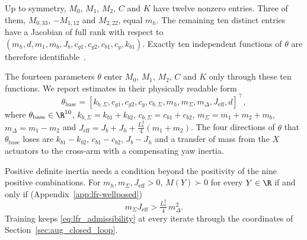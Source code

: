Up to symmetry, $M_0$, $M_1$, $M_2$, $C$ and $K$ have twelve nonzero entries.
Three of them, $M_{0,33}$, $-M_{1,12}$ and $M_{2,22}$, equal $m_h$.
The remaining ten distinct entries have a Jacobian of full rank with respect
to $(m_h,d,m_1,m_b,J_b,c_{g1},c_{g2},c_{b1},c_y,k_{b1})$.
Exactly ten independent functions of $\theta$ are therefore
identifiable~\cite[Def.~7]{ovchinnikov2021computing}.

The fourteen parameters $\theta$ enter $M_0$, $M_1$, $M_2$, $C$ and $K$ only
through these ten functions.
We report estimates in their physically readable form
\begin{equation}
  \theta_{\mathrm{base}}=[k_{b,\Sigma},c_{g1},c_{g2},c_y,c_{b,\Sigma},
  m_h,m_\Sigma,m_\Delta,J_{\mathrm{eff}},d]^\top,
  \label{eq:phi}
\end{equation}
where $\theta_{\mathrm{base}}\in\R^{10}$, $k_{b,\Sigma}=k_{b1}+k_{b2}$,
$c_{b,\Sigma}=c_{b1}+c_{b2}$, $m_\Sigma=m_1+m_2+m_b$, $m_\Delta=m_1-m_2$ and
$J_{\mathrm{eff}}=J_b+J_h+\tfrac{L_b^2}{4}(m_1+m_2)$.
The four directions of $\theta$ that $\theta_{\mathrm{base}}$ loses are
$k_{b1}-k_{b2}$, $c_{b1}-c_{b2}$, $J_b-J_h$ and a transfer of mass from the $X$
actuators to the cross-arm with a compensating yaw inertia.

Positive definite inertia needs a condition beyond the positivity of the nine
positive combinations.
For $m_h,m_\Sigma,J_{\mathrm{eff}}>0$, $M(Y)\succ0$ for every $Y\in\R$ if and
only if (Appendix~\ref{app:lfr-wellposed})
\begin{equation}
  m_\Sigma J_{\mathrm{eff}}>\tfrac{L_b^2}{4}\,m_\Delta^2.
  \label{eq:lfr_admissibility}
\end{equation}
Training keeps \eqref{eq:lfr_admissibility} at every iterate through the
coordinates of Section~\ref{sec:aug_closed_loop}.

